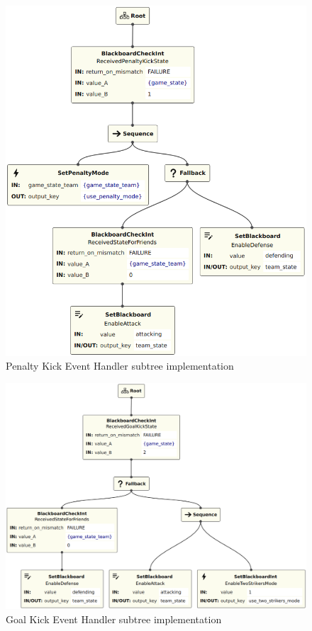 \begin{figure}[!h]
    \centering
    \includegraphics[width=0.7\linewidth]{chapters/development/images/PenaltyKickEventHandler.png}
    \caption{Penalty Kick Event Handler subtree implementation}
    \label{fig:penalty_kick_event_handler_impl}
\end{figure}

\begin{figure}[!h]
    \centering
    \includegraphics[width=0.9\linewidth]{chapters/development/images/GoalKickEventHandler.png}
    \caption{Goal Kick Event Handler subtree implementation}
    \label{fig:goal_kick_event_handler_impl}
\end{figure}


